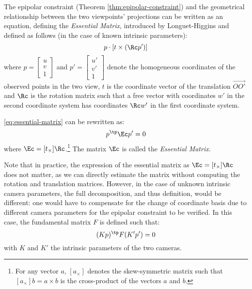 The epipolar constraint (Theorem \ref{thm:epipolar-constraint}) and the geometrical relationship between the two viewpoints' projections can be written as an equation, defining the \emph{Essential Matrix}, introduced by Longuet-Higgins and defined as follows (in the case of known intrinsic parameters):
\begin{equation}
    \label{eq:essential-matrix}
    p\cdot[t\times(\Rc p')]
\end{equation}
where $p=\begin{bmatrix}u\\v\\1\end{bmatrix}$ and $p'=\begin{bmatrix}u'\\v'\\1\end{bmatrix}$ denote the homogeneous coordinates of the observed points in the two view, $t$ is the coordinate vector of the translation $\overrightarrow{OO'}$ and $\Rc$ is the rotation matrix such that a free vector with coordinates $w'$ in the second coordinate system has coordinates $\Rc w'$ in the first coordinate system.

\autoref{eq:essential-matrix} can be rewritten as:
\begin{equation}
    p^\tp\Ec p' = 0
\end{equation}
where $\Ec=[t_\times]\Rc$.\footnote{For any vector $a$, $[a_\times]$ denotes the skew-symmetric matrix such that $[a_\times]b=a\times b$ is the cross-product of the vectors $a$ and $b$.} The matrix $\Ec$ is called the \emph{Essential Matrix}.

\begin{remark}
    Note that in practice, the expression of the essential matrix as $\Ec=[t_\times]\Rc$ does not matter, as we can directly estimate the matrix without computing the rotation and translation matrices. However, in the case of unknown intrinsic camera parameters, the full decomposition, and thus definition, would be different: one would have to compensate for the change of coordinate basis due to different camera parameters for the epipolar constraint to be verified. In this case, the fundamental matrix $F$ is defined such that:
    \begin{equation*}
        (Kp)^\tp F(K'p')=0
    \end{equation*}
    with $K$ and $K'$ the intrinsic parameters of the two cameras.
\end{remark}

